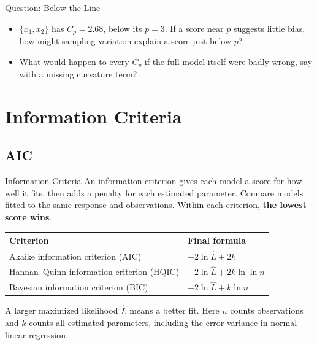\begin{frame}{Question: Below the Line}
    \begin{itemize}
        \item $\{x_1,x_2\}$ has $C_p=2.68$, below its $p=3$. If a score near $p$ suggests little bias, how might sampling variation explain a score just below $p$?
        \item What would happen to every $C_p$ if the full model itself were badly wrong, say with a missing curvature term?
    \end{itemize}
\end{frame}


\section{Information Criteria}


\subsection{AIC}


\begin{frame}{Information Criteria}
    An information criterion gives each model a score for how well it fits, then adds a penalty for each estimated parameter. Compare models fitted to the same response and observations. Within each criterion, \textbf{the lowest score wins}.
    \begin{center}
        \small
        \begin{tabular}{ll}
            \toprule
            Criterion & Final formula \\
            \midrule
            Akaike information criterion (AIC) & $-2\ln\hat L+2k$ \\
            Hannan--Quinn information criterion (HQIC) & $-2\ln\hat L+2k\ln\ln n$ \\
            Bayesian information criterion (BIC) & $-2\ln\hat L+k\ln n$ \\
            \bottomrule
        \end{tabular}
    \end{center}
    A larger maximized likelihood $\hat L$ means a better fit. Here $n$ counts observations and $k$ counts all estimated parameters, including the error variance in normal linear regression.
\end{frame}



